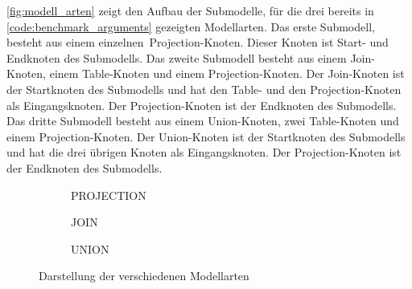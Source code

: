 \autoref{fig:modell_arten} zeigt den Aufbau der Submodelle, für die drei
bereits in \autoref{code:benchmark_arguments} gezeigten Modellarten.
Das erste Submodell, besteht aus einem
einzelnen \foreignlanguage{english}{Projection}-Knoten. Dieser Knoten ist
Start- und Endknoten des Submodells. Das zweite Submodell besteht aus
einem \foreignlanguage{english}{Join}-Knoten, einem
\foreignlanguage{english}{Table}-Knoten und einem
\foreignlanguage{english}{Projection}-Knoten. Der
\foreignlanguage{english}{Join}-Knoten ist der Startknoten des Submodells und
hat den \foreignlanguage{english}{Table}- und den
\foreignlanguage{english}{Projection}-Knoten als Eingangsknoten.
Der \foreignlanguage{english}{Projection}-Knoten ist der Endknoten des
Submodells. Das dritte Submodell besteht aus einem
\foreignlanguage{english}{Union}-Knoten, zwei
\foreignlanguage{english}{Table}-Knoten und einem
\foreignlanguage{english}{Projection}-Knoten. Der
\foreignlanguage{english}{Union}-Knoten ist der Startknoten des Submodells und
hat die drei übrigen Knoten als Eingangsknoten. Der
\foreignlanguage{english}{Projection}-Knoten ist der Endknoten des Submodells.

\begin{figure}
    \center
    \begin{subfigure}[b]{0.2\textwidth}
        \center
         
        \caption{\foreignlanguage{english}{PROJECTION}}\label{modell_art_projection}
    \end{subfigure}
    \begin{subfigure}[b]{0.3\textwidth}
        \center
         
        \caption{\foreignlanguage{english}{JOIN}}\label{modell_art_join}
    \end{subfigure}
    \begin{subfigure}[b]{0.4\textwidth} 
        \center
        
        \caption{\foreignlanguage{english}{UNION}}\label{modell_art_union}
    \end{subfigure}
    \caption{Darstellung der verschiedenen Modellarten}\label{fig:modell_arten}
\end{figure}
